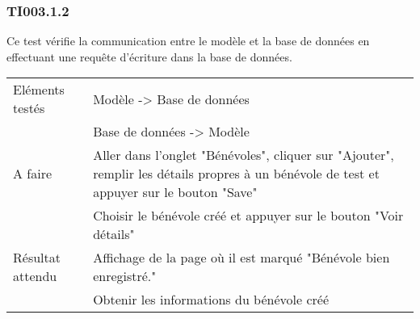 
  	\subsubsection{TI003.1.2}
  	\label{TI003.1.2}
  		Ce test vérifie la communication entre le modèle et la base de données en effectuant une requête d'écriture dans la base de données.
  		\begin{center}
    	 		\begin{tabular}[h]{|p{}|p{}|}
			\hline
				Eléments testés & Modèle -> Base de données  \\
							    &  Base de données -> Modèle \\\hline
    				A faire &  Aller dans l'onglet "Bénévoles", cliquer sur "Ajouter", remplir les détails propres à un bénévole de test et appuyer sur le bouton "Save" \\
    						& Choisir le bénévole créé et appuyer sur le bouton "Voir détails" \\\hline
    				Résultat attendu & Affichage de la page où il est marqué "Bénévole bien enregistré." \\
    								 & Obtenir les informations du bénévole créé \\\hline
     		\end{tabular}
  		\end{center}	